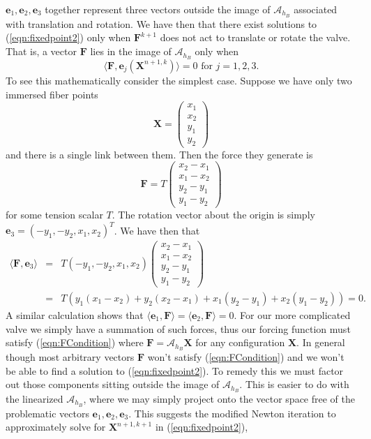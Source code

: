 \documentclass[preprint,12pt]{elsarticle}
\begin{document}
$\mathbf{e}_1,\mathbf{e}_2,\mathbf{e}_3$ together represent three vectors outside the image of $\mathcal{A}_{h_B}$ associated with translation and rotation.
We have then that there exist solutions to (\ref{eqn:fixedpoint2}) only when $\mathbf{F}^{k+1}$ does not act to translate or rotate the valve. That is, a vector $\mathbf{F}$ lies in the image of $\mathcal{A}_{h_B}$ only when 
\begin{equation}
\langle \mathbf{F}, \mathbf{e}_j(\mathbf{X}^{n+1,k}) \rangle = 0
\textrm{ for } j=1,2,3.
\label{eqn:FCondition}
\end{equation}
To see this mathematically consider the simplest case. Suppose we have only two immersed fiber points
\begin{equation}
\mathbf{X}=
\left( \begin{array}{c}
x_1\\x_2\\y_1\\y_2
\end{array} \right)
\end{equation}
and there is a single link between them. Then the force they generate is
\begin{equation}
\mathbf{F}=T
\left( \begin{array}{c}
x_2-x_1\\x_1-x_2\\y_2-y_1\\y_1-y_2
\end{array} \right)
\end{equation}
for some tension scalar $T$.
The rotation vector about the origin is simply $\mathbf{e}_3=(-y_1,-y_2,x_1,x_2)^T$. We have then that
\begin{eqnarray}
\langle \mathbf{F},\mathbf{e}_3 \rangle &=&
T(-y_1,-y_2,x_1,x_2)
\left( \begin{array}{c}
x_2-x_1\\x_1-x_2\\y_2-y_1\\y_1-y_2
\end{array} \right) \\
&=& T\left(y_1(x_1-x_2)+y_2(x_2-x_1)+x_1(y_2-y_1)+x_2(y_1-y_2)\right)=0.
\end{eqnarray}
A similar calculation shows that $\langle \mathbf{e}_1,\mathbf{F} \rangle = \langle \mathbf{e}_2,\mathbf{F} \rangle = 0.$
For our more complicated valve we simply have a summation of such forces, thus our forcing function must satisfy (\ref{eqn:FCondition}) where $\mathbf{F}=\mathcal{A}_{h_B}\mathbf{X}$ for any configuration $\mathbf{X}$. In general though most arbitrary vectors $\mathbf{F}$ won't satisfy (\ref{eqn:FCondition}) and we won't be able to find a solution to (\ref{eqn:fixedpoint2}). To remedy this we must factor out those components sitting outside the image of $\mathcal{A}_{h_B}$. This is easier to do with the linearized $\mathcal{A}_{h_B}$, where we may simply project onto the vector space free of the problematic vectors $\mathbf{e}_1,\mathbf{e}_2,\mathbf{e}_3$. This suggests the modified Newton iteration to approximately solve for $\mathbf{X}^{n+1,k+1}$ in (\ref{eqn:fixedpoint2}),
\end{document}
